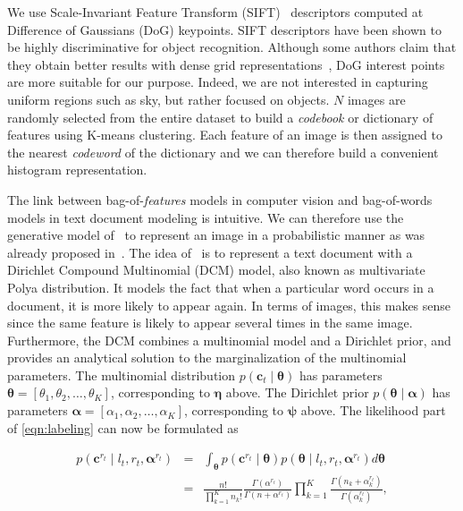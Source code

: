 We use Scale-Invariant Feature Transform (SIFT)~\cite{lowe04distinctive}
descriptors computed at Difference of Gaussians (DoG) keypoints. SIFT
descriptors have been shown to be highly discriminative for object recognition.
Although some authors claim that they obtain better results with dense grid
representations~\cite{feifei05bayesian}, DoG interest points are more suitable
for our purpose. Indeed, we are not interested in capturing uniform regions such
as sky, but rather focused on objects. $N$ images are randomly selected from the
entire dataset to build a \emph{codebook} or dictionary of features using
K-means clustering. Each feature of an image is then assigned to the nearest
\emph{codeword} of the dictionary and we can therefore build a convenient
histogram representation.

The link between bag-of-\emph{features} models in computer vision and
bag-of-words models in text document modeling is intuitive. We can therefore use
the generative model of~\cite{madsen05modeling} to represent an image in a
probabilistic manner as was already proposed in~\cite{ranganathan09bayesian}.
The idea of~\cite{madsen05modeling} is to represent a text document with a
Dirichlet Compound Multinomial (DCM) model, also known as multivariate Polya
distribution. It models the fact that when a particular word occurs in a
document, it is more likely to appear again. In terms of images, this makes
sense since the same feature is likely to appear several times in the same
image. Furthermore, the DCM combines a multinomial model and a Dirichlet prior,
and provides an analytical solution to the marginalization of the multinomial
parameters. The multinomial distribution $p(\mathbf{c}_t\mid
\boldsymbol{\theta})$ has parameters $\boldsymbol{\theta}=[\theta_1,\theta_2,
\dots,\theta_K]$, corresponding to $\boldsymbol{\eta}$ above. The Dirichlet
prior $p(\boldsymbol{\theta}\mid\boldsymbol{\alpha})$ has parameters
$\boldsymbol{\alpha}=[\alpha_1,\alpha_2,\dots,\alpha_K]$, corresponding to
$\boldsymbol{\psi}$ above. The likelihood part of \eqref{eqn:labeling} can now
be formulated as

\begin{eqnarray}
\label{eqn:polya}
p(\mathbf{c}^{r_t}\mid l_t,r_t,\boldsymbol{\alpha}^{r_t})&=&
\int_{\boldsymbol{\theta}}
p(\mathbf{c}^{r_t}\mid\boldsymbol{\theta})p(\boldsymbol{\theta}\mid
l_t,r_t,\boldsymbol{\alpha}^{r_t})d\boldsymbol{\theta}\\\nonumber
&=&\frac{n!}{\prod_{k=1}^K n_k!}\frac{\Gamma(\alpha^{r_t})}
{\Gamma(n+\alpha^{r_t})}\prod_{k=1}^K\frac{\Gamma(n_k+\alpha^{r_t}_k)}
{\Gamma(\alpha^{r_t}_k)},
\end{eqnarray}


